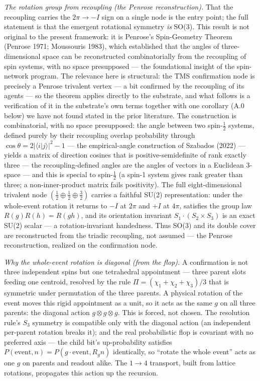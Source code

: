 \documentclass[11pt,oneside]{report}
\theoremstyle{definition}
\theoremstyle{remark}
\begin{document}
\emph{The rotation group from recoupling (the Penrose reconstruction).} That the
recoupling carries the \ensuremath{2\pi \to -I} sign on a single node is the entry point;
the full statement is that the emergent rotational symmetry \emph{is} SO(3). This
result is not original to the present framework: it is Penrose's Spin-Geometry
Theorem (Penrose 1971; Moussouris 1983), which established that the angles of
three-dimensional space can be reconstructed combinatorially from the recoupling
of spin systems, with no space presupposed --- the foundational insight of the
spin-network program. The relevance here is structural: the TMS confirmation node
is precisely a Penrose trivalent vertex --- a bit confirmed by the recoupling of
its agents --- so the theorem applies directly to the substrate, and what follows
is a verification of it in the substrate's own terms together with one corollary
(A.0 below) we have not found stated in the prior literature. The construction is
combinatorial, with no space presupposed: the angle between two
spin-\ensuremath{\tfrac{1}{2}} systems, defined purely by their recoupling overlap probability
through \ensuremath{\cos\theta = 2\lvert\langle i \vert j\rangle\rvert^{2} - 1} --- the
empirical-angle construction of Szabados (2022) --- yields a
matrix of direction cosines that is positive-semidefinite of rank exactly three
--- the recoupling-defined angles are the angles of vectors in a Euclidean
3-space --- and this is special to spin-\ensuremath{\tfrac{1}{2}} (a spin-1 system gives rank
greater than three; a non-inner-product matrix fails positivity). The full
eight-dimensional trivalent node \ensuremath{(\tfrac{1}{2} \oplus \tfrac{1}{2} \oplus \tfrac{3}{2})} carries a
faithful SU(2) representation: under the whole-event rotation it returns to
\ensuremath{-I} at \ensuremath{2\pi} and \ensuremath{+I} at \ensuremath{4\pi}, satisfies the group law
\ensuremath{R(g)R(h) = R(gh)}, and its orientation invariant \ensuremath{S_{1}\cdot(S_{2}\times S_{3})}
is an exact SU(2) scalar --- a rotation-invariant handedness. Thus SO(3) and its
double cover are reconstructed from the triadic recoupling, not assumed --- the
Penrose reconstruction, realized on the confirmation node.

\emph{Why the whole-event rotation is diagonal (from the flop).} A confirmation
is not three independent spins but one tetrahedral appointment --- three parent
slots feeding one centroid, resolved by the rule \ensuremath{\Pi = (\chi_{1}+\chi_{2}+\chi_{3})/3}
that is symmetric under permutation of the three parents. A physical rotation of
the event moves this rigid appointment as a unit, so it acts as the same
\ensuremath{g} on all three parents: the diagonal action \ensuremath{g\otimes g\otimes g}. This is
forced, not chosen. The resolution rule's \ensuremath{S_{3}} symmetry is compatible only with
the diagonal action (an independent per-parent rotation breaks it); and the real
probabilistic flop is covariant with no preferred axis --- the child bit's
up-probability satisfies \ensuremath{P(\text{event}, n) = P(g\cdot\text{event}, R_{g}n)}
identically, so ``rotate the whole event'' acts as one \ensuremath{g} on parents and
readout alike. The \ensuremath{1\to 4} transport, built from lattice rotations, propagates
this action up the recursion.
\end{document}
